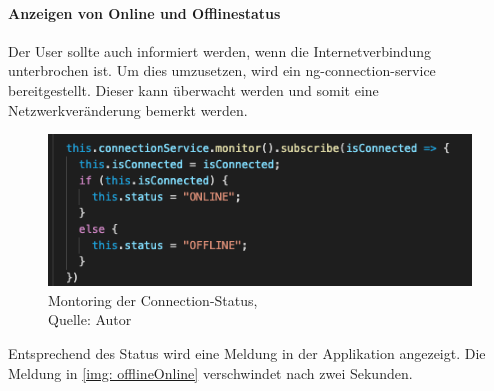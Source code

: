 \paragraph{Anzeigen von Online und Offlinestatus}
Der User sollte auch informiert werden, wenn die Internetverbindung unterbrochen ist. Um dies umzusetzen, wird ein ng-connection-service bereitgestellt. Dieser kann überwacht werden und somit eine Netzwerkveränderung bemerkt werden. 
\begin{figure}[H]
	\centering
	\includegraphics[scale=0.6]{images/connectionService.PNG}
	\caption[Montoring der Connection-Status]{Montoring der Connection-Status,\\ Quelle: Autor}
	\label{img: connectionState}
\end{figure} 
\newpage
Entsprechend des Status wird eine Meldung in der Applikation angezeigt. Die Meldung in \ref{img: offlineOnline} verschwindet nach zwei Sekunden. 
